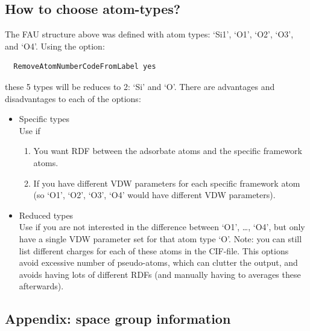 \subsection{How to choose atom-types?}

The FAU structure above was defined with atom types: `Si1', `O1', `O2', `O3', and `O4'. Using the option:
\begin{verbatim}
  RemoveAtomNumberCodeFromLabel yes
\end{verbatim}
these 5 types will be reduces to 2: `Si' and `O'. There are advantages and disadvantages to each of the options:
\begin{itemize}
\item{Specific types}\\
  Use if
  \begin{enumerate}
    \item{You want RDF between the adsorbate atoms and the specific framework atoms.}   
    \item{If you have different VDW parameters for each specific framework atom (so `O1', `O2', `O3', `O4' would have different VDW parameters).}
  \end{enumerate}
\item{Reduced types}\\
  Use if you are not interested in the difference between `O1', \dots, `O4', but only have a single VDW parameter set for that atom type `O'.
  Note: you can still list different charges for each of these atoms in the CIF-file.
  This options avoid excessive number of pseudo-atoms, which can clutter the output, and avoids having lots of different RDFs (and manually having to averages these afterwards).
\end{itemize}


\newpage
\clearpage
\subsection*{Appendix: space group information}

